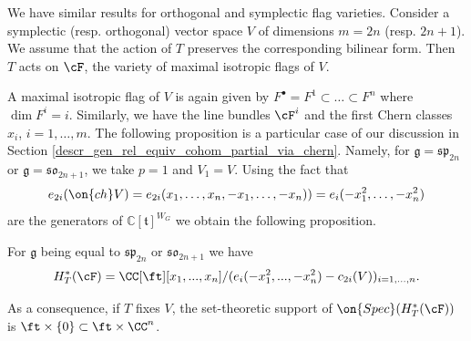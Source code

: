 \documentclass[12pt]{amsart}
\begin{document}
We have similar results for orthogonal and symplectic flag varieties. Consider a symplectic (resp. orthogonal) vector space $V$ of dimensions $m=2n$ (resp. $2n+1$). We assume that the action of $T$ preserves the corresponding bilinear form. Then $T$ acts on $\cF$, the variety of maximal isotropic flags of $V$. 

A maximal isotropic flag of $V$ is again given by $F^{\bullet}= F^{1}\subset\ldots\subset F^{n}$ where $\dim F^i= i$. Similarly, we have the line bundles $\cF^i$ and the first Chern classes $x_i$, $i=1,\ldots,m$. 
The following proposition is a particular case of our discussion in Section \ref{descr_gen_rel_equiv_cohom_partial_via_chern}. Namely, for $\mathfrak{g}=\mathfrak{sp}_{2n}$ or $\mathfrak{g}=\mathfrak{so}_{2n+1}$, we take $p=1$ and $V_1=V$.
Using the fact that 
\begin{equation*}
e_{2i}(\on{ch}V)=e_{2i}(x_1,\ldots,x_{n},-x_1,\ldots,-x_{n}))=
e_i(-x_1^2,\ldots,-x_n^2)
\end{equation*}
are the generators of $\mathbb{C}[\mathfrak{t}]^{W_G}$
we obtain the following proposition.
\begin{prop}\cite[Proposition 13.3.1]{Anderson2023EquivariantCI}
    For $\mathfrak{g}$ being equal to $\mathfrak{sp}_{2n}$ or $\mathfrak{so}_{2n+1}$ we have 
    $$
    H^{*}_{T}(\cF)= \CC[\ft][x_1,...,x_n]/(e_i(-x_{1}^{2},...,-x_{n}^{2})- c_{2i}(V))_{i=1,\ldots,n}.
    $$

\end{prop}
\begin{cor} \label{single point support 2}
    As a consequence, if $T$ fixes $V$, the set-theoretic support of $\on{Spec}(H^{*}_{T}(\cF))$ is $\ft\times \{0\}\subset \ft\times \CC^n$.
\end{cor}
\end{document}
